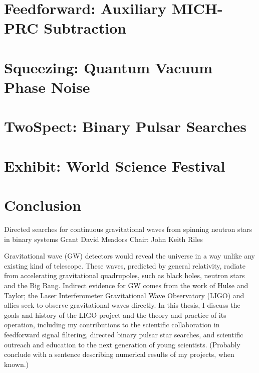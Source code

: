 \documentclass[leqno]{report}
\theoremstyle{plain}
\theoremstyle{definition}
\theoremstyle{remark}
\numberwithin{theorem}{chapter}        %
\begin{document}
\chapter{Feedforward: Auxiliary MICH-PRC Subtraction}
\label{chap2}

\chapter{Squeezing: Quantum Vacuum Phase Noise}
\label{chap3}

\chapter{TwoSpect: Binary Pulsar Searches}
\label{chap4}

\chapter{Exhibit: World Science Festival}
\label{chap5}

\chapter{Conclusion}
\label{conclusion}



%




\startabstractpage
{Directed searches for continuous gravitational waves from spinning neutron stars in binary systems } {Grant David Meadors} {Chair: John Keith Riles}

Gravitational wave (GW) detectors would reveal the universe in a way unlike any existing kind of telescope. These waves, predicted by general relativity, radiate from accelerating gravitational quadrupoles, such as black holes, neutron stars and the Big Bang. Indirect evidence for GW comes from the work of Hulse and Taylor; the Laser Interferometer Gravitational Wave Observatory (LIGO) and allies seek to observe gravitational waves directly. In this thesis, I discuss the goals and history of the LIGO project and the theory and practice of its operation, including my contributions to the scientific collaboration in feedforward signal filtering, directed binary pulsar star searches, and scientific outreach and education to the next generation of young scientists. (Probably conclude with a sentence describing numerical results of my projects, when known.)
\end{document}
